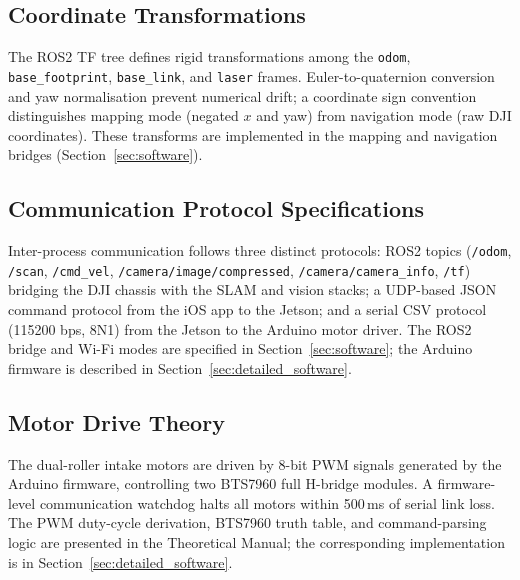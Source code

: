 \subsection{Coordinate Transformations}
\label{sec:theory_transforms}

The ROS2 TF tree defines rigid transformations among the \texttt{odom}, \texttt{base\_footprint}, \texttt{base\_link}, and \texttt{laser} frames. Euler-to-quaternion conversion and yaw normalisation prevent numerical drift; a coordinate sign convention distinguishes mapping mode (negated $x$ and yaw) from navigation mode (raw DJI coordinates). These transforms are implemented in the mapping and navigation bridges (Section~\ref{sec:software}).

\subsection{Communication Protocol Specifications}
\label{sec:theory_comms}

Inter-process communication follows three distinct protocols: ROS2 topics (\texttt{/odom}, \texttt{/scan}, \texttt{/cmd\_vel}, \texttt{/camera/image/compressed}, \texttt{/camera/camera\_info}, \texttt{/tf}) bridging the DJI chassis with the SLAM and vision stacks; a UDP-based JSON command protocol from the iOS app to the Jetson; and a serial CSV protocol (115200 bps, 8N1) from the Jetson to the Arduino motor driver. The ROS2 bridge and Wi-Fi modes are specified in Section~\ref{sec:software}; the Arduino firmware is described in Section~\ref{sec:detailed_software}.

\subsection{Motor Drive Theory}
\label{sec:theory_motor}

The dual-roller intake motors are driven by 8-bit PWM signals generated by the Arduino firmware, controlling two BTS7960 full H-bridge modules. A firmware-level communication watchdog halts all motors within 500\,ms of serial link loss. The PWM duty-cycle derivation, BTS7960 truth table, and command-parsing logic are presented in the Theoretical Manual; the corresponding implementation is in Section~\ref{sec:detailed_software}.
